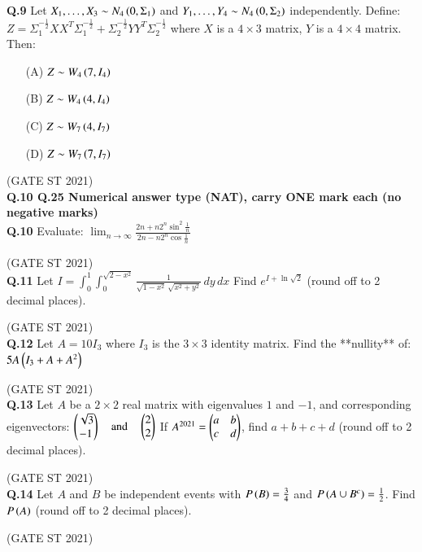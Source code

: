 \documentclass[journal,12pt,onecolumn]{IEEEtran}
\theoremstyle{remark}
\begin{document}
 

\textbf{Q.9}
Let $X_1,\dots,X_3 \sim N_4\left(0,\Sigma_1\right)$ and $Y_1,\dots,Y_4 \sim N_4\left(0,\Sigma_2\right)$ independently.  
Define:
$
Z = \Sigma_1^{-\frac12}XX^T\Sigma_1^{-\frac12} + \Sigma_2^{-\frac12}YY^T\Sigma_2^{-\frac12}
$
where $X$ is a $4\times 3$ matrix, $Y$ is a $4\times 4$ matrix.  
Then:
\begin{enumerate}
\item[(A)] $Z \sim W_4\left(7, I_4\right)$
\item[(B)] $Z \sim W_4\left(4, I_4\right)$
\item[(C)] $Z \sim W_7\left(4, I_7\right)$
\item[(D)] $Z \sim W_7\left(7, I_7\right)$
\end{enumerate}
\hfill (GATE ST 2021) \\

\textbf{Q.10 \text{-} Q.25 Numerical answer type (NAT), carry ONE mark each (no negative marks)} \\
 \textbf{Q.10}
Evaluate:
$
\lim_{n \to \infty} \frac{2n + n 2^n \sin^2\frac{1}{n}}{2n - n 2^n \cos\frac{1}{n}}
$

\hfill (GATE ST 2021) \\
\textbf{Q.11}
Let
$
I = \int_{0}^{1} \int_{0}^{\sqrt{2 - x^2}} \frac{1}{\sqrt{1 - x^2} \, \sqrt{x^2 + y^2}} \, dy \, dx
$
Find $e^{I + \ln{\sqrt{2}}}$ (round off to 2 decimal places).

\hfill (GATE ST 2021) \\

\textbf{Q.12}
Let $A = 10I_3$ where $I_3$ is the $3 \times 3$ identity matrix.  
Find the **nullity** of:
$
5A \left(I_3 + A + A^2\right)
$

\hfill (GATE ST 2021) \\

\textbf{Q.13}
Let $A$ be a $2 \times 2$ real matrix with eigenvalues $1$ and $-1$, and corresponding eigenvectors:
$
\begin{pmatrix} \sqrt{3} \\ -1 \end{pmatrix}
\quad \text{and} \quad
\begin{pmatrix} 2 \\ 2 \end{pmatrix}
$
If $A^{2021} = \begin{pmatrix} a & b \\ c & d \end{pmatrix}$,  
find $a+b+c+d$ (round off to 2 decimal places).

\hfill (GATE ST 2021) \\

\textbf{Q.14}
Let $A$ and $B$ be independent events with $P\left(B\right) = \frac{3}{4}$ and $P\left(A \cup B^c\right) = \frac12$.  
Find $P\left(A\right)$ (round off to 2 decimal places).

\hfill (GATE ST 2021) \\
\end{document}
